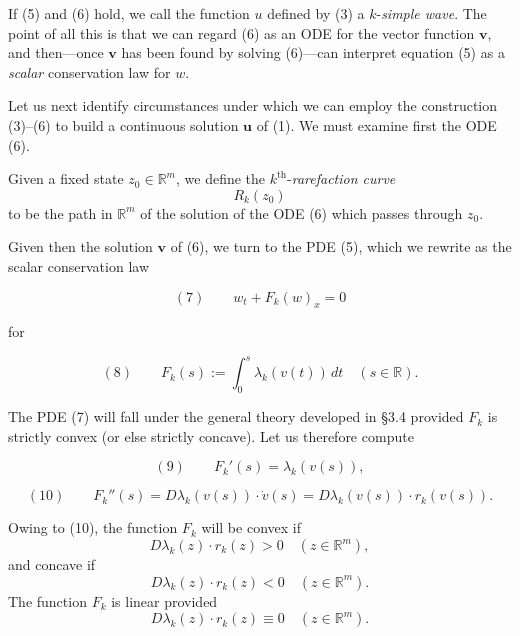 If (5) and (6) hold, we call the function $u$ defined by (3) a $k$-\textit{simple wave}. The point of all this is that we can regard (6) as an ODE for the vector function $\mathbf{v}$, and then---once $\mathbf{v}$ has been found by solving (6)---can interpret equation (5) as a \textit{scalar} conservation law for $w$.

Let us next identify circumstances under which we can employ the construction (3)--(6) to build a continuous solution $\mathbf{u}$ of (1). We must examine first the ODE (6).

\begin{definition}
\label{def:rarefaction-curve}
Given a fixed state $z_0\in\mathbb{R}^m$, we define the $k^{\text{th}}$-\textit{rarefaction curve}
$$R_k(z_0)$$
to be the path in $\mathbb{R}^m$ of the solution of the ODE (6) which passes through $z_0$.
\end{definition}

\begin{figure}[h]\centering
\end{figure}

Given then the solution $\mathbf{v}$ of (6), we turn to the PDE (5), which we rewrite as the scalar conservation law

$$(7) \qquad w_t + F_k(w)_x = 0$$

for

$$(8) \qquad F_k(s) := \int_0^s \lambda_k(v(t))\,dt \quad (s\in\mathbb{R}).$$

The PDE (7) will fall under the general theory developed in \S3.4 provided $F_k$ is strictly convex (or else strictly concave). Let us therefore compute

$$(9) \qquad F_k'(s) = \lambda_k(v(s)),$$

$$(10) \qquad F_k''(s) = D\lambda_k(v(s))\cdot\dot v(s) = D\lambda_k(v(s))\cdot r_k(v(s)).$$

Owing to (10), the function $F_k$ will be convex if
$$D\lambda_k(z)\cdot r_k(z) > 0 \quad (z\in\mathbb{R}^m),$$
and concave if
$$D\lambda_k(z)\cdot r_k(z) < 0 \quad (z\in\mathbb{R}^m).$$
The function $F_k$ is linear provided
$$D\lambda_k(z)\cdot r_k(z) \equiv 0 \quad (z\in\mathbb{R}^m).$$

